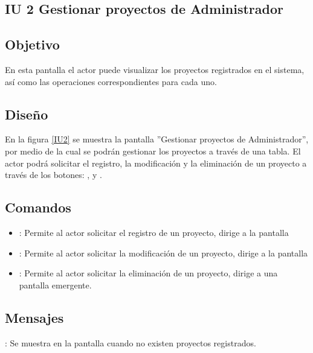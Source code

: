 \subsection{IU 2 Gestionar proyectos de Administrador}

\subsection{Objetivo}
	En esta pantalla el actor puede visualizar los proyectos registrados en el sistema, así como las operaciones correspondientes para cada uno.

\subsection{Diseño}
	En la figura \ref{IU2} se muestra la pantalla ''Gestionar proyectos de Administrador'', por medio de la cual se podrán gestionar los proyectos a través de una tabla. El actor podrá solicitar el registro, la modificación y la eliminación de un proyecto a través de los botones: , \editar y \eliminar.

\label{IU2}
\subsection{Comandos}
\begin{itemize}
	\item {}: Permite al actor solicitar el registro de un proyecto, dirige a la pantalla 
	\item \editar [Modificar]: Permite al actor solicitar la modificación de un proyecto, dirige a la pantalla 
	\item \eliminar [Eliminar]: Permite al actor solicitar la eliminación de un proyecto, dirige a una pantalla emergente.
\end{itemize}

\subsection{Mensajes}

\begin{Citemize}
	\item {}: Se muestra en la pantalla  cuando no existen proyectos registrados.
\end{Citemize}
